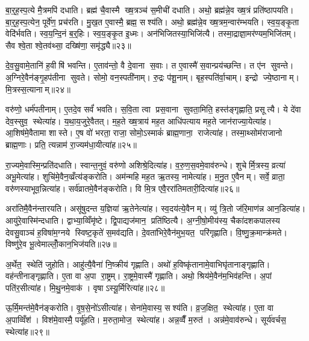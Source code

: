 बा॒र्॒ह॒स्प॒त्ये मै॒त्रमपि॑ दधाति। ब्रह्म॑ चै॒वास्मै ख्ष॒त्रञ्च॑ स॒मीची॑ दधाति। अथो॒ ब्रह्म॑न्ने॒व ख्ष॒त्रं प्रति॑ष्ठापयति। बा॒र्॒ह॒स्प॒त्येन॒ पूर्वे॑ण॒ प्रच॑रति। मु॒ख॒त ए॒वास्मै॒ ब्रह्म॒ सश्य॑ति। अथो॒ ब्रह्म॑न्ने॒व ख्ष॒त्रम॒न्वार॑म्भयति। स्व॒य॒ङ्कृ॒ता वेदि॑र्भवति। स्व॒य॒न्दि॒नं ब॒र्॒हिः। स्व॒य॒ङ्कृ॒त इ॒ध्मः। अन॑भिजितस्या॒भिजि॑त्यै। तस्मा॒द्राज्ञा॒मर॑ण्यम॒भिजि॑तम्। सैव श्वे॒ता श्वे॒तव॑थ्सा॒ दख्षि॑णा॒ समृ॑द्ध्यै॥२३॥\anuvakamend[र॒त्नि॒त्वाय॒ समृ॑द्ध्यै पष्ठौ॒ही दख्षि॑णा॒ समृ॑द्ध्यै ग्राम॒ण्यो॑ गृ॒हे भा॑गदु॒घस्य॑ गृ॒हे भ॑वति दु॒ग्धे॑ऽभिजि॑त्यै॒ द्वे च॑]

दे॒व॒सु॒वामे॒तानि॑ ह॒वीषि॑ भवन्ति। ए॒ताव॑न्तो॒ वै दे॒वाना स॒वाः। त ए॒वास्मै॑ स॒वान्प्रय॑च्छन्ति। त ए॑न सुवन्ते। अ॒ग्निरे॒वैन॑ङ्गृ॒हप॑तीना सुवते। सोमो॒ वन॒स्पती॑नाम्। रु॒द्रः प॑शू॒नाम्। बृह॒स्पति॑र्वा॒चाम्। इन्द्रो ज्ये॒ष्ठानाम्। मि॒त्रस्स॒त्यानाम्॥२४॥

वरु॑णो॒ धर्म॑पतीनाम्। ए॒तदे॒व सर्वं॑ भवति। स॒वि॒ता त्वा प्रस॒वाना सुवता॒मिति॒ हस्त॑ङ्गृह्णाति॒ प्रसूत्यै। ये दे॑वा देव॒स्सुव॒ स्थेत्या॑ह। य॒था॒य॒जुरे॒वैतत्। म॒ह॒ते ख्ष॒त्राय॑ मह॒त आधि॑पत्याय मह॒ते जान॑राज्या॒येत्या॑ह। आ॒शिष॑मे॒वैतामा शास्ते। ए॒ष वो॑ भरता॒ राजा॒ सोमो॒ऽस्माकं॑ ब्राह्म॒णाना॒ राजेत्या॑ह। तस्मा॒थ्सोम॑राजानो ब्राह्म॒णाः। प्रति॒ त्यन्नाम॑ रा॒ज्यम॑धा॒यीत्या॑ह॥२५॥

रा॒ज्यमे॒वास्मि॒न्प्रति॑दधाति। स्वान्त॒नुवं॒ वरु॑णो अशिश्रे॒दित्या॑ह। व॒रु॒ण॒स॒वमे॒वाव॑रुन्धे। शुचेर्मि॒त्रस्य॒ व्रत्या॑ अभू॒मेत्या॑ह। शुचि॑मे॒वैन॒व्व्रँत्य॑ङ्करोति। अम॑न्महि मह॒त ऋ॒तस्य॒ नामेत्या॑ह। म॒नु॒त ए॒वैनम्। सर्वे॒ व्राता॒ वरु॑णस्याभूव॒न्नित्या॑ह। सर्व॑व्रातमे॒वैन॑ङ्करोति। वि मि॒त्र एवै॒ररा॑तिमतारी॒दित्या॑ह॥२६॥

अरा॑तिमै॒वैन॑न्तारयति। असू॑षुदन्त य॒ज्ञिया॑ ऋ॒तेनेत्या॑ह। स्व॒दय॑त्ये॒वैनम्। व्यु॑ त्रि॒तो ज॑रि॒माण॑न्न आन॒डित्या॑ह। आयु॑रे॒वास्मि॑न्दधाति। द्वाभ्या॒व्विँमृ॑ष्टे। द्वि॒पाद्यज॑मान॒ प्रति॑ष्ठित्यै। अ॒ग्नी॒षो॒मीय॑स्य॒ चैका॑दशकपालस्य देवसु॒वाञ्च॑ ह॒विषा॑म॒ग्नये स्विष्ट॒कृते॑ स॒मव॑द्यति। दे॒वता॑भिरे॒वैन॑मुभ॒यत॒ परि॑गृह्णाति। वि॒ष्णु॒क्र॒मान्क्र॑मते। विष्णु॑रे॒व भू॒त्वेमाल्लोँ॒कान॒भिज॑यति॥२७॥\anuvakamend[स॒त्याना॑मधा॒यीत्या॑हातारी॒दित्या॑ह क्रमत॒ एक॑ञ्च]

अ॒र्थेत॒ स्थेति॑ जुहोति। आहु॑त्यै॒वैना॑ नि॒ष्क्रीय॑ गृह्णाति। अथो॑ ह॒विष्कृ॑तानामे॒वाभिघृ॑तानाङ्गृह्णाति। वह॑न्तीनाङ्गृह्णाति। ए॒ता वा अ॒पा रा॒ष्ट्रम्। रा॒ष्ट्रमे॒वास्मै॑ गृह्णाति। अथो॒ श्रिय॑मे॒वैन॑म॒भिव॑हन्ति। अ॒पां पति॑र॒सीत्या॑ह। मि॒थु॒नमे॒वाक॑। वृषाऽस्यू॒र्मिरित्या॑ह॥२८॥

ऊ॒र्मि॒मन्त॑मे॒वैन॑ङ्करोति। वृ॒ष॒से॒नो॑ऽसीत्या॑ह। सेना॑मे॒वास्य॒ सश्य॑ति। व्र॒ज॒क्षित॒ स्थेत्या॑ह। ए॒ता वा अ॒पाव्विँश॑। विश॑मे॒वास्मै॒ पर्यू॑हति। म॒रुता॒मोज॒ स्थेत्या॑ह। अन्न॒व्वैँ म॒रुत॑। अन्न॑मे॒वाव॑रुन्धे। सूर्य॑वर्चस॒ स्थेत्या॑ह॥२९॥

